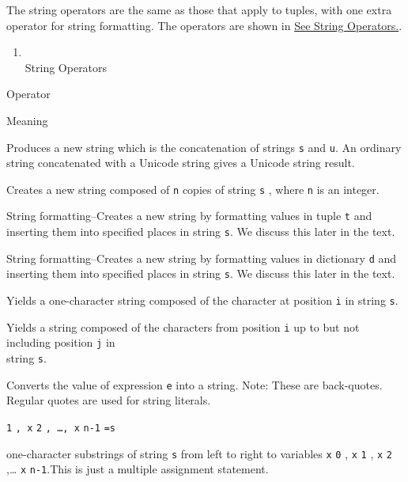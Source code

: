 The string operators are the same
as those that apply to tuples, with one extra operator for string
formatting. The operators are shown in \href{chap2.html\#53096}{See
String Operators.}.

\begin{enumerate}

\item
  \\
  String Operators
\end{enumerate}

Operator

Meaning



Produces a new string which is the
concatenation of strings \texttt{s} and \texttt{u}. An ordinary string
concatenated with a Unicode string gives a Unicode string result.





Creates a new string composed of
\texttt{n} copies of string \texttt{s} , where \texttt{n} is an integer.



String formatting--Creates a new
string by formatting values in tuple \texttt{t} and inserting them into
specified places in string \texttt{s}. We discuss this later in the text.



String formatting--Creates a new
string by formatting values in dictionary \texttt{d} and inserting them
into specified places in string \texttt{s}. We discuss this later in the
text.



Yields a one-character string
composed of the character at position \texttt{i} in string \texttt{s}.



Yields a string composed of the
characters from position \texttt{i} up to but not including position
\texttt{j} in\\
string \texttt{s}.



Converts the value of expression
\texttt{e} into a string. Note: These are back-quotes. Regular quotes are
used for string literals.


\texttt{1} \texttt{, x} \texttt{2} \texttt{, \ldots{}, x} \texttt{n-1} \texttt{=s}

 one-character
substrings of string \texttt{s} from left to right to variables \texttt{x}
\texttt{0} , \texttt{x} \texttt{1} , \texttt{x} \texttt{2} ,\ldots{} \texttt{x}
\texttt{n-1}.This is just a multiple assignment statement.

